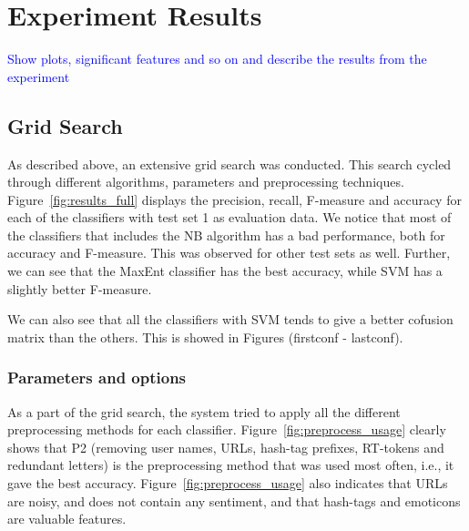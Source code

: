 \section{Experiment Results}
\textcolor{blue}{Show plots, significant features and so on and describe the results from the experiment}

\subsection{Grid Search}
As described above, an extensive grid search was conducted. This search cycled through different algorithms, parameters and preprocessing techniques. Figure~\ref{fig:results_full} displays the precision, recall, F-measure and accuracy for each of the classifiers with test set 1 as evaluation data. We notice that most of the classifiers that includes the NB algorithm has a bad performance, both for accuracy and F-measure. This was observed for other test sets as well. Further, we can see that the MaxEnt classifier has the best accuracy, while SVM has a slightly better F-measure.

We can also see that all the classifiers with SVM tends to give a better cofusion matrix than the others. This is showed in Figures (firstconf - lastconf).

\subsubsection{Parameters and options}
As a part of the grid search, the system tried to apply all the different preprocessing methods for each classifier. Figure~\ref{fig:preprocess_usage} clearly shows that P2 (removing user names, URLs, hash-tag prefixes, RT-tokens and redundant letters) is the preprocessing method that was used most often, i.e., it gave the best accuracy. Figure~\ref{fig:preprocess_usage} also indicates that URLs are noisy, and does not contain any sentiment, and that hash-tags and emoticons are valuable features.


